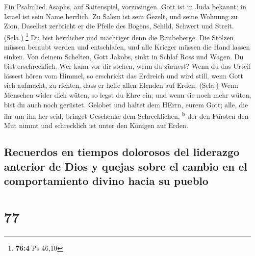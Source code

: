  Ein Psalmlied Asaphs, auf Saitenspiel, vorzusingen.
 Gott ist in Juda bekannt; in Israel ist sein Name
herrlich.  Zu Salem ist sein Gezelt, und seine Wohnung zu
Zion.  Daselbst zerbricht er die Pfeile des Bogens,
Schild, Schwert und Streit. (Sela.) \footnote{\textbf{76:4} Ps 46,10}
 Du bist herrlicher und mächtiger denn die Raubeberge.
 Die Stolzen müssen beraubt werden und entschlafen, und
alle Krieger müssen die Hand lassen sinken.  Von deinem
Schelten, Gott Jakobs, sinkt in Schlaf Ross und Wagen.  Du
bist erschrecklich. Wer kann vor dir stehen, wenn du zürnest?
 Wenn du das Urteil lässest hören vom Himmel, so
erschrickt das Erdreich und wird still,  wenn Gott sich
aufmacht, zu richten, dass er helfe allen Elenden auf Erden. (Sela.)
 Wenn Menschen wider dich wüten, so legst du Ehre ein;
und wenn sie noch mehr wüten, bist du auch noch gerüstet.
 Gelobet und haltet dem HErrn, eurem Gott; alle, die ihr
um ihn her seid, bringet Geschenke dem Schrecklichen,
\textsuperscript{b}  der den Fürsten den Mut nimmt und
schrecklich ist unter den Königen auf Erden.

\hypertarget{recuerdos-en-tiempos-dolorosos-del-liderazgo-anterior-de-dios-y-quejas-sobre-el-cambio-en-el-comportamiento-divino-hacia-su-pueblo}{%
\subsection{Recuerdos en tiempos dolorosos del liderazgo anterior de
Dios y quejas sobre el cambio en el comportamiento divino hacia su
pueblo}\label{recuerdos-en-tiempos-dolorosos-del-liderazgo-anterior-de-dios-y-quejas-sobre-el-cambio-en-el-comportamiento-divino-hacia-su-pueblo}}

\hypertarget{section-76}{%
\section{77}\label{section-76}}

